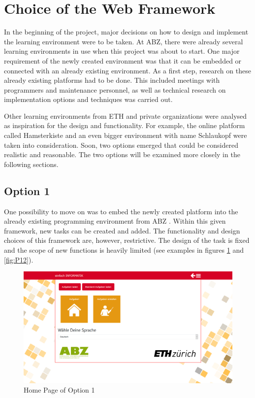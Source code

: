 \section{Choice of the Web Framework}
\label{section:designchoice}
In the beginning of the project, major decisions on how to design and implement the learning environment were to be taken. At ABZ, there were already several learning environments in use when this project was about to start. One major requirement of the newly created environment was that it can be embedded or connected with an already existing environment. As a first step, research on these already existing platforms had to be done. This included meetings with programmers and maintenance personnel, as well as technical research on implementation options and techniques was carried out. 

Other learning environments from ETH \cite{L1} and private organizations were analysed as inspiration for the design and functionality. For example, the online platform called Hamsterkiste \cite{L2} and an even bigger environment with name Schlaukopf \cite{L3} were taken into consideration. Soon, two options emerged that could be considered realistic and reasonable. The two options will be examined more closely in the following sections.

\subsection{Option 1}
One possibility to move on was to embed the newly created platform into the already existing programming environment from ABZ \cite{SBT}. Within this given framework, new tasks can be created and added. The functionality and design choices of this framework are, however, restrictive. The design of the task is fixed and the scope of new functions is heavily limited  (see examples in figures \ref{fig:P11} and  \ref{fig:P12}). 


\begin{figure}[H]
    \centering
    \includegraphics[width=1.0\columnwidth]{figures/P12.png}
    \caption{Home Page of Option 1}
    \label{fig:P11} 
\end{figure}

